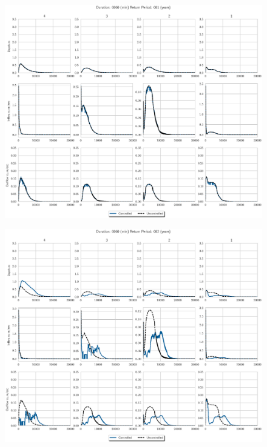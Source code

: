 \begin{figure}
    \centering
    \includegraphics[width=\linewidth]{./RL-SI-figures/77storms/0060001.eps}
\end{figure}
\begin{figure}
    \centering
    \includegraphics[width=\linewidth]{./RL-SI-figures/77storms/0060002.eps}
\end{figure}
